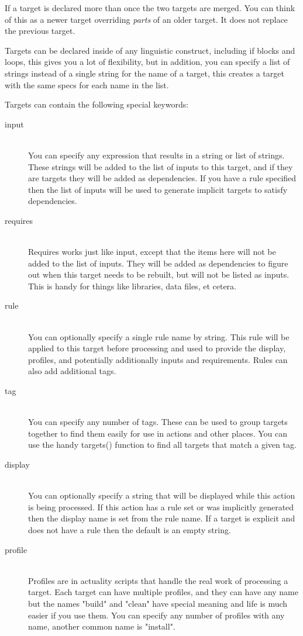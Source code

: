 \documentclass[letterpaper]{book}
\begin{document}
If a target is declared more than once the two targets are merged.  You can
think of this as a newer target overriding \emph{parts} of an older target.  It
does not replace the previous target.

Targets can be declared inside of any linguistic construct, including if blocks
and loops, this gives you a lot of flexibility, but in addition, you can
specify a list of strings instead of a single string for the name of a target,
this creates a target with the same specs for each name in the list.

Targets can contain the following special keywords:

\begin{description}
    \item[input] \hfill \\
    You can specify any expression that results in a string or list of strings.
    These strings will be added to the list of inputs to this target, and if
    they are targets they will be added as dependencies.  If you have a rule
    specified then the list of inputs will be used to generate implicit targets
    to satisfy dependencies.
    \item[requires] \hfill \\
    Requires works just like input, except that the items here will not be added
    to the list of inputs.  They will be added as dependencies to figure out
    when this target needs to be rebuilt, but will not be listed as inputs.
    This is handy for things like libraries, data files, et cetera.
    \item[rule] \hfill \\
    You can optionally specify a single rule name by string.  This rule will be
    applied to this target before processing and used to provide the display,
    profiles, and potentially additionally inputs and requirements.  Rules can
    also add additional tags.
    \item[tag] \hfill \\
    You can specify any number of tags.  These can be used to group targets
    together to find them easily for use in actions and other places.  You can
    use the handy targets() function to find all targets that match a given tag.
    \item[display] \hfill \\
    You can optionally specify a string that will be displayed while this
    action is being processed.  If this action has a rule set or was implicitly
    generated then the display name is set from the rule name.  If a target is
    explicit and does not have a rule then the default is an empty string.
    \item[profile] \hfill \\
    Profiles are in actuality scripts that handle the real work of processing
    a target.  Each target can have multiple profiles, and they can have any
    name but the names "build" and "clean" have special meaning and life is
    much easier if you use them.  You can specify any number of profiles with
    any name, another common name is  "install".
\end{description}
\end{document}
